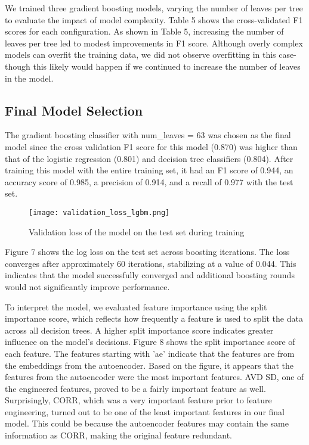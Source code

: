 \documentclass[11pt,letterpaper]{article}
\begin{document}
We trained three gradient boosting models, varying the number of leaves per tree to evaluate the impact of model complexity. Table 5 shows the cross-validated F1 scores for each configuration. As shown in Table 5, increasing the number of leaves per tree led to modest improvements in F1 score. Although overly complex models can overfit the training data, we did not observe overfitting in this case- though this likely would happen if we continued to increase the number of leaves in the model. 

\subsection{Final Model Selection}
The gradient boosting classifier with num\_leaves = 63 was chosen as the final model since the cross validation F1 score for this model (0.870) was higher than that of the logistic regression (0.801) and decision tree classifiers (0.804). After training this model with the entire training set, it had an F1 score of 0.944, an accuracy score of 0.985, a precision of 0.914, and a recall of 0.977 with the test set.

\begin{figure}[H]
    \centering
    \texttt{[image: validation\_loss\_lgbm.png]}
    \caption{Validation loss of the model on the test set during training}
    \label{fig:enter-label}
\end{figure}

Figure 7 shows the log loss on the test set across boosting iterations. The loss converges after approximately 60 iterations, stabilizing at a value of 0.044. This indicates that the model successfully converged and additional boosting rounds would not significantly improve performance.

To interpret the model, we evaluated feature importance using the split importance score, which reflects how frequently a feature is used to split the data across all decision trees. A higher split importance score indicates greater influence on the model’s decisions. Figure 8 shows the split importance score of each feature. The features starting with 'ae' indicate that the features are from the embeddings from the autoencoder. Based on the figure, it appears that the features from the autoencoder were the most important features. AVD SD, one of the engineered features, proved to be a fairly important feature as well. Surprisingly, CORR, which was a very important feature prior to feature engineering, turned out to be one of the least important features in our final model. This could be because the autoencoder features may contain the same information as CORR, making the original feature redundant.
\end{document}
